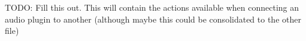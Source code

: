 TODO: Fill this out. This will contain the actions available when connecting an audio plugin to another (although maybe this could be consolidated to the other file)

